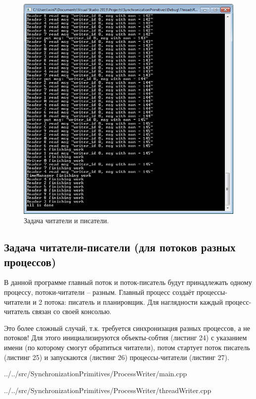 \documentclass[a4paper, 12pt]{article}		%
\begin{document}
\begin{figure}[h!]
\centering
\includegraphics[scale=1]{res/006}
\caption{Задача читатели и писатели.}
\end{figure}


\newpage
\subsection{Задача читатели-писатели (для потоков разных процессов)}

В данной программе главный поток и поток-писатель будут принадлежать одному процессу, потоки-читатели – разным. Главный процесс создаёт процессы-читатели и 2 потока: писатель и планировщик. Для наглядности каждый процесс-читатель связан со своей консолью.

Это более сложный случай, т.к. требуется синхронизация разных процессов, а не потоков! Для этого инициализируются объекты-собтия (листинг 24) с указанием имени (по которому смогут обратиться читатели), потом стартует поток писатель (листинг 25) и запускаются (листинг 26) процессы-читатели (листинг 27).


{../../src/SynchronizationPrimitives/ProcessWriter/main.cpp}


{../../src/SynchronizationPrimitives/ProcessWriter/threadWriter.cpp}
\newpage
\end{document}
